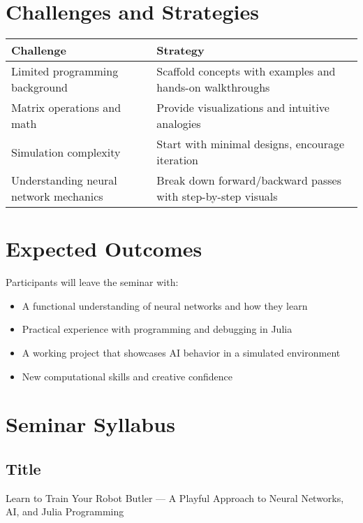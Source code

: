 \documentclass[10pt]{book}
\begin{document}
\section{Challenges and Strategies}

\begin{center}
\begin{tabular}{@{}p{5cm}p{9cm}@{}}
\toprule
\textbf{Challenge} & \textbf{Strategy} \\
\midrule
Limited programming background & Scaffold concepts with examples and hands-on walkthroughs \\
Matrix operations and math & Provide visualizations and intuitive analogies \\
Simulation complexity & Start with minimal designs, encourage iteration \\
Understanding neural network mechanics & Break down forward/backward passes with step-by-step visuals \\
\bottomrule
\end{tabular}
\end{center}

\section{Expected Outcomes}

Participants will leave the seminar with:
\begin{itemize}[itemsep=1ex]
    \item A functional understanding of neural networks and how they learn
    \item Practical experience with programming and debugging in Julia
    \item A working project that showcases AI behavior in a simulated environment
    \item New computational skills and creative confidence
\end{itemize}



\section*{Seminar Syllabus}

\subsection*{Title}
Learn to Train Your Robot Butler — A Playful Approach to Neural Networks, AI, and Julia Programming
\end{document}
